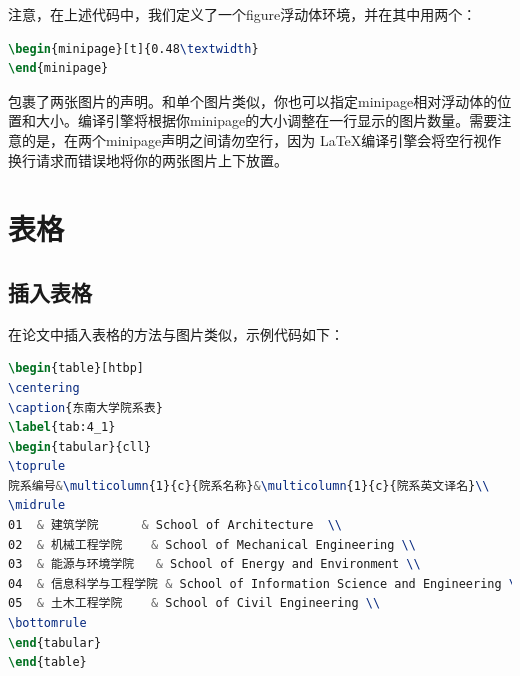 注意，在上述代码中，我们定义了一个{\codefont figure}浮动体环境，并在其中用两个：

\begin{tcolorbox}
\begin{lstlisting}[language=TeX]
\begin{minipage}[t]{0.48\textwidth}
\end{minipage}
\end{lstlisting}
\end{tcolorbox}

\noindent 包裹了两张图片的声明。和单个图片类似，你也可以指定{\codefont minipage}相对浮动体的位置和大小。编译引擎将根据你{\codefont minipage}的大小调整在一行显示的图片数量。需要注意的是，在两个{\codefont minipage}声明之间请勿空行，因为 \LaTeX 编译引擎会将空行视作换行请求而错误地将你的两张图片上下放置。

\section{表格}

\subsection{插入表格}

在论文中插入表格的方法与图片类似，示例代码如下：

\begin{tcolorbox}
\begin{lstlisting}[language=TeX]
\begin{table}[htbp]
\centering
\caption{东南大学院系表}
\label{tab:4_1}
\begin{tabular}{cll}
\toprule
院系编号&\multicolumn{1}{c}{院系名称}&\multicolumn{1}{c}{院系英文译名}\\
\midrule
01  & 建筑学院      & School of Architecture  \\
02  & 机械工程学院    & School of Mechanical Engineering \\
03  & 能源与环境学院   & School of Energy and Environment \\
04  & 信息科学与工程学院 & School of Information Science and Engineering \\
05  & 土木工程学院    & School of Civil Engineering \\
\bottomrule
\end{tabular}
\end{table}
\end{lstlisting}
\end{tcolorbox}

